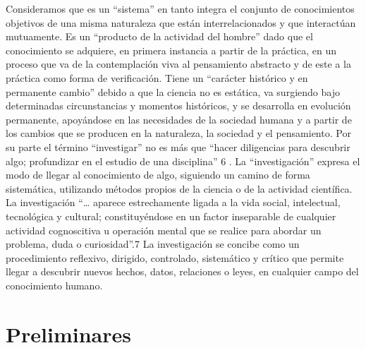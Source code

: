 \documentclass[12pt,]{krantz}
\theoremstyle{definition}
\theoremstyle{definition}
\theoremstyle{definition}
\theoremstyle{remark}
\begin{document}
Consideramos que es un ``sistema'' en tanto integra el conjunto de
conocimientos
objetivos
de
una
misma
naturaleza
que
están
interrelacionados y que interactúan mutuamente.
Es un ``producto de la actividad del hombre'' dado que el conocimiento
se adquiere, en primera instancia a partir de la práctica, en un proceso que
va de la contemplación viva al pensamiento abstracto y de este a la práctica
como forma de verificación.
Tiene un ``carácter histórico y en permanente cambio'' debido a que la
ciencia no es estática, va surgiendo bajo determinadas circunstancias y
momentos históricos, y se desarrolla en evolución permanente, apoyándose
en las necesidades de la sociedad humana y a partir de los cambios que se
producen en la naturaleza, la sociedad y el pensamiento.
Por su parte el término ``investigar'' no es más que ``hacer diligencias para
descubrir algo; profundizar en el estudio de una disciplina'' 6
.
La ``investigación''
expresa el modo de llegar al conocimiento de algo,
siguiendo un camino de forma sistemática, utilizando métodos propios de la
ciencia o de la actividad científica. La investigación ``\ldots{} aparece estrechamente
ligada a la vida social, intelectual, tecnológica y cultural; constituyéndose en un
factor inseparable de cualquier actividad cognoscitiva u operación mental que se
realice para abordar un problema, duda o curiosidad''.7
La investigación se concibe como un procedimiento reflexivo, dirigido,
controlado, sistemático y crítico que permite llegar a descubrir nuevos
hechos, datos, relaciones o leyes, en cualquier campo del conocimiento
humano.

\hypertarget{preliminares}{%
\chapter*{Preliminares}\label{preliminares}}
\end{document}
